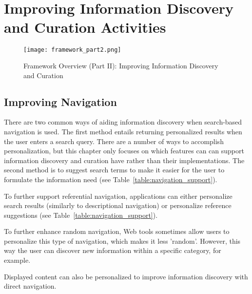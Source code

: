 \chapter{Improving Information Discovery and Curation Activities}
\label{chapter:improving}


\begin{figure}[ht!]
	\noindent
	\centering
	\texttt{[image: framework\_part2.png]}
	\caption{Framework Overview (Part II): Improving Information Discovery and Curation}
	\label{fig:framework_part2} 
\end{figure}

{\section{Improving Navigation}
There are two common ways of aiding information discovery when search-based navigation is used. The first method entails returning personalized results when the user enters a search query. There are a number of ways to accomplish personalization, but this chapter only focuses on which features can can support information discovery and curation have rather than their implementations. The second method is to suggest search terms to make it easier for the user to formulate the information need (see Table~\ref{table:navigation_support}).

To further support referential navigation, applications can either personalize search results (similarly to descriptional navigation) or personalize reference suggestions (see Table~\ref{table:navigation_support}). 

To further enhance random navigation, Web tools sometimes allow users to personalize this type of navigation, which makes it less 'random'. However, this way the user can discover new information within a specific category, for example.

Displayed content can also be personalized to improve information discovery with direct navigation.

}

